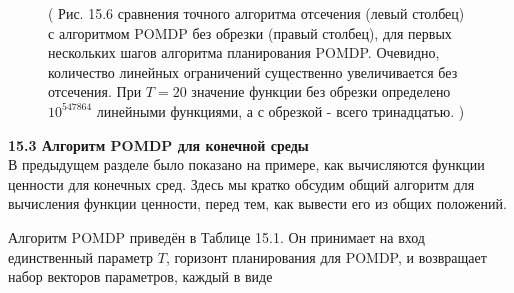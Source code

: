 \documentclass[10pt,a4paper]{article}
\begin{document}
\begin{figure}[H]
	\caption{ ( Рис. 15.6 сравнения точного алгоритма отсечения (левый столбец) с алгоритмом POMDP без обрезки (правый столбец), для первых нескольких шагов алгоритма планирования POMDP. Очевидно, количество линейных ограничений существенно увеличивается без отсечения. При $T = 20$ значение функции без обрезки определено $10^{547864}$ линейными функциями, а с обрезкой - всего тринадцатью. ) }
	\label{fig:156orig}
\end{figure}

\textbf{15.3	Алгоритм POMDP для конечной среды}\\

В предыдущем разделе было показано на примере, как вычисляются функции ценности для конечных сред. Здесь мы кратко обсудим общий алгоритм для вычисления функции ценности, перед тем, как вывести его из общих положений.

Алгоритм POMDP приведён в Таблице 15.1. Он принимает на вход единственный параметр $T$, горизонт планирования для POMDP, и возвращает набор векторов параметров, каждый в виде\\
\end{document}
